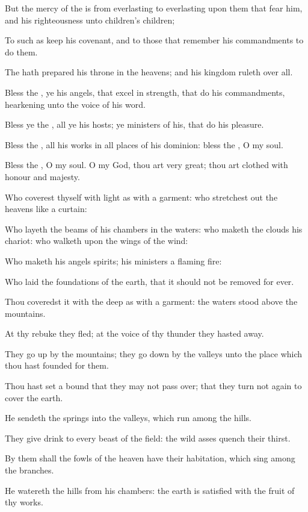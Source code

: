 \Verse But the mercy of the \LORD is from everlasting to everlasting upon them that fear him, and his righteousness unto children's children;

\Verse To such as keep his covenant, and to those that remember his commandments to do them.

\Verse The \LORD hath prepared his throne in the heavens; and his kingdom ruleth over all.

\Verse Bless the \LORD, ye his angels, that excel in strength, that do his commandments, hearkening unto the voice of his word.

\Verse Bless ye the \LORD, all ye his hosts; ye ministers of his, that do his pleasure.

\Verse Bless the \LORD, all his works in all places of his dominion: bless the \LORD, O my soul.




\Chapter
\Verse Bless the \LORD, O my soul. O \LORD my God, thou art very great; thou art clothed with honour and majesty.

\Verse Who coverest thyself with light as with a garment: who stretchest out the heavens like a curtain:

\Verse Who layeth the beams of his chambers in the waters: who maketh the clouds his chariot: who walketh upon the wings of the wind:

\Verse Who maketh his angels spirits; his ministers a flaming fire:

\Verse Who laid the foundations of the earth, that it should not be removed for ever.

\Verse Thou coveredst it with the deep as with a garment: the waters stood above the mountains.

\Verse At thy rebuke they fled; at the voice of thy thunder they hasted away.

\Verse They go up by the mountains; they go down by the valleys unto the place which thou hast founded for them.

\Verse Thou hast set a bound that they may not pass over; that they turn not again to cover the earth.

\Verse He sendeth the springs into the valleys, which run among the hills.

\Verse They give drink to every beast of the field: the wild asses quench their thirst.

\Verse By them shall the fowls of the heaven have their habitation, which sing among the branches.

\Verse He watereth the hills from his chambers: the earth is satisfied with the fruit of thy works.

